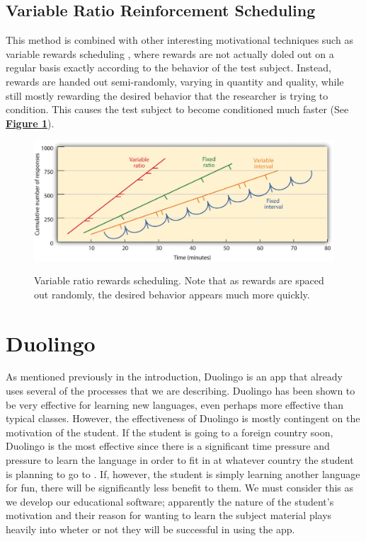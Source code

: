 \subsection{Variable Ratio Reinforcement Scheduling}
 This method is combined with other interesting motivational techniques such as variable rewards scheduling \cite{ferster1957schedules} \cite{hardy_heyes_1999}, where rewards are not actually doled out on a regular basis exactly according to the behavior of the test subject. Instead, rewards are handed out semi-randomly, varying in quantity and quality, while still mostly rewarding the desired behavior that the researcher is trying to condition. This causes the test subject to become conditioned much faster (See \textbf{\hyperref[fig:variable_ratio]{Figure \ref*{fig:variable_ratio}}}).
 
 \begin{figure}[h]
 	\includegraphics[width=1.0\linewidth]{figures/variable_ratio}
 	\caption{Variable ratio rewards scheduling. Note that as rewards are spaced out randomly, the desired behavior appears much more quickly.}
 	\label{fig:variable_ratio}
 	\cite{hardy_heyes_1999}
 \end{figure}

\section{Duolingo}
As mentioned previously in the introduction, Duolingo is an app that already uses several of the processes that we are describing. Duolingo has been shown to be very effective for learning new languages, even perhaps more effective than typical classes. However, the effectiveness of Duolingo is mostly contingent on the motivation of the student. If the student is going to a foreign country soon, Duolingo is the most effective since there is a significant time pressure and pressure to learn the language in order to fit in at whatever country the student is planning to go to \cite{vesselinov2012duolingo}. If, however, the student is simply learning another language for fun, there will be significantly less benefit to them. We must consider this as we develop our educational software; apparently the nature of the student's motivation and their reason for wanting to learn the subject material plays heavily into wheter or not they will be successful in using the app.

